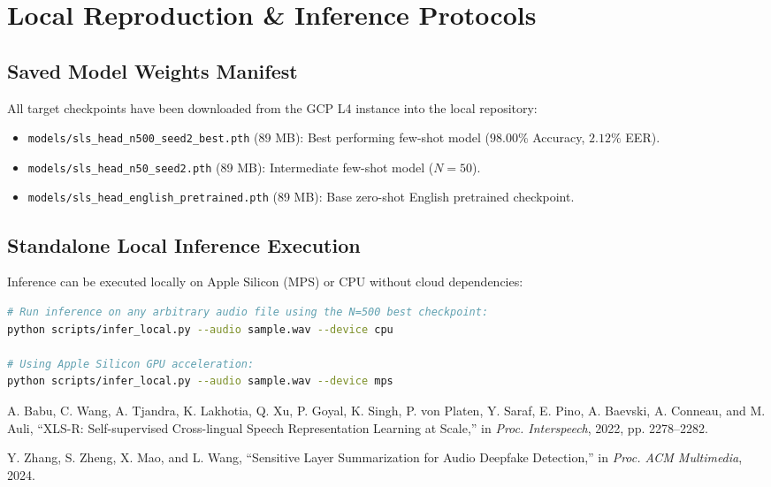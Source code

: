 \documentclass[11pt,a4paper]{article}
\begin{document}
\section{Local Reproduction \& Inference Protocols}

\subsection{Saved Model Weights Manifest}
All target checkpoints have been downloaded from the GCP L4 instance into the local repository:
\begin{itemize}
    \item \texttt{models/sls\_head\_n500\_seed2\_best.pth} (89 MB): Best performing few-shot model ($98.00\%$ Accuracy, $2.12\%$ EER).
    \item \texttt{models/sls\_head\_n50\_seed2.pth} (89 MB): Intermediate few-shot model ($N=50$).
    \item \texttt{models/sls\_head\_english\_pretrained.pth} (89 MB): Base zero-shot English pretrained checkpoint.
\end{itemize}

\subsection{Standalone Local Inference Execution}
Inference can be executed locally on Apple Silicon (MPS) or CPU without cloud dependencies:
\begin{lstlisting}[language=bash]
# Run inference on any arbitrary audio file using the N=500 best checkpoint:
python scripts/infer_local.py --audio sample.wav --device cpu

# Using Apple Silicon GPU acceleration:
python scripts/infer_local.py --audio sample.wav --device mps
\end{lstlisting}

\begin{thebibliography}{99}
A. Babu, C. Wang, A. Tjandra, K. Lakhotia, Q. Xu, P. Goyal, K. Singh, P. von Platen, Y. Saraf, E. Pino, A. Baevski, A. Conneau, and M. Auli, ``XLS-R: Self-supervised Cross-lingual Speech Representation Learning at Scale,'' in \textit{Proc. Interspeech}, 2022, pp. 2278--2282.

Y. Zhang, S. Zheng, X. Mao, and L. Wang, ``Sensitive Layer Summarization for Audio Deepfake Detection,'' in \textit{Proc. ACM Multimedia}, 2024.
\end{thebibliography}
\end{document}
